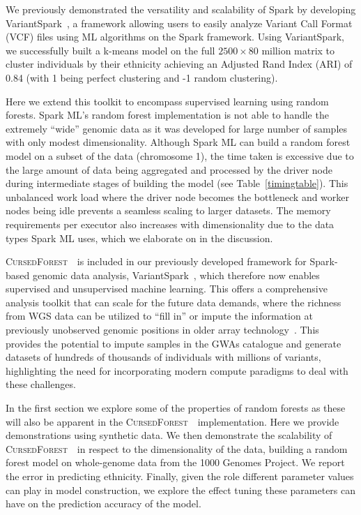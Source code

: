 \documentclass[10pt,letterpaper]{article}
\newcommand{\cursedforest}{\textsc{CursedForest}\ }
\begin{document}
We previously demonstrated the versatility and scalability of Spark by developing VariantSpark~\cite{OBrien2015}, a
framework allowing users to easily analyze Variant Call Format (VCF) files using ML algorithms on the Spark framework.
Using VariantSpark, we successfully built a k-means model on the full $2500 \times 80$ million matrix to cluster
individuals by their ethnicity achieving an Adjusted Rand Index (ARI) of 0.84 (with 1 being perfect clustering and -1
random clustering).

Here we extend this toolkit to encompass supervised learning using random forests.  Spark ML's random forest
implementation is not able to handle the extremely ``wide'' genomic data as it was developed for large number of samples
with only modest dimensionality.  Although Spark ML can build a random forest model on a subset of the data (chromosome
1), the time taken is excessive due to the large amount of data being aggregated and processed by the driver node during
intermediate stages of building the model (see Table~\ref{timingtable}).  This unbalanced work load where the driver
node becomes the bottleneck and worker nodes being idle prevents a seamless scaling to larger datasets. The memory
requirements per executor also increases with dimensionality due to the data types Spark ML uses, which we elaborate on
in the discussion.

\cursedforest\ is included in our previously developed framework for Spark-based genomic data analysis,
VariantSpark~\cite{OBrien2015}, which therefore now enables supervised and unsupervised machine learning. This offers a
comprehensive analysis toolkit that can scale for the future data demands, where the richness from WGS data can be
utilized to ``fill in'' or impute the information at previously unobserved genomic positions in older array
technology~\cite{Howie2012}.  This provides the potential to impute samples in the GWAs catalogue and generate datasets
of hundreds of thousands of individuals with millions of variants, highlighting the need for incorporating modern
compute paradigms to deal with these challenges.

In the first section we explore some of the properties of random forests as these will also be apparent in the
\cursedforest\ implementation. Here we provide demonstrations using synthetic data.  We then demonstrate the scalability
of \cursedforest\ in respect to the dimensionality of the data, building a random forest model on whole-genome data from
the 1000 Genomes Project. We report the error in predicting ethnicity.  Finally, given the role
different parameter values can play in model construction, we explore the effect tuning these parameters can have on the
prediction accuracy of the model.
\end{document}
